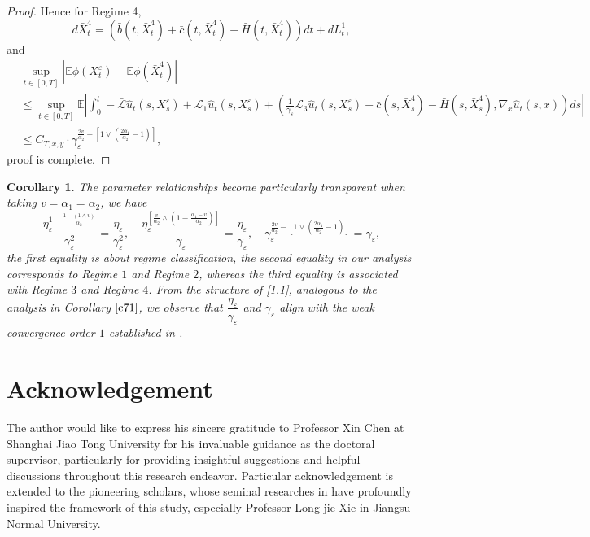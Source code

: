\documentclass[11pt,reqno]{amsart}
\newtheorem{corollary}{\indent Corollary}[section]
\numberwithin{equation}{section}
\begin{document}
\begin{proof}
Hence  for Regime 4,
\begin{equation}\label{7.25}
	d\bar{X}^{4}_{t}=(\bar{b}(t,\bar{X}^{4}_{t})+\bar{c}(t,\bar{X}^{4}_{t})+\bar{H}(t,\bar{X}^{4}_{t}))dt+dL_{t}^{1},
\end{equation}
and 
\begin{align*}
		&\sup_{t\in [0,T]}|\mathbb{E}\phi(X_{t}^{\varepsilon})-\mathbb{E}\phi(\bar{X}^{4}_{t})|\\
		&\leq\sup_{t\in [0,T]}\mathbb{E} \left|\int_{0}^{t}-\mathcal{\bar{L}}\hat{u}_{t}(s,X_{s}^{\varepsilon})+\mathcal{L}_{1}\hat{u}_{t}(s,X_{s}^{\varepsilon}) +(\frac{1}{\gamma_{\varepsilon}} \mathcal{L}_{3}\hat{u}_{t}(s,X_{s}^{\varepsilon})-\bar{c}(s,\bar{X}^{4}_{s})-\bar{H}(s,\bar{X}^{4}_{s}),\nabla_{x}\hat{u}_{t}(s,x)) ds\right| \\
		&\leq C_{T,x,y}\cdot \gamma_{\varepsilon}^{\frac{2v}{\alpha_{2}}-\left[ 1\vee \left( \frac{2\alpha_{1}}{\alpha_{2}}-1\right)   \right] },
\end{align*}
proof is complete.
\end{proof}

\begin{corollary}\label{c72}
The parameter relationships become particularly transparent when taking $v=\alpha_{1}=\alpha_{2}$, we have
$$ \frac{\eta_{\varepsilon}^{1-\frac{1-(1\wedge v)}{\alpha_{2}}}}{\gamma_{\varepsilon}^{2}}= \frac{\eta_{\varepsilon}}{\gamma_{\varepsilon}^{2}},\quad 	\frac{ \eta_{\varepsilon}^{\left[ \frac{v}{\alpha_{2}}\wedge \left( 1-\frac{\alpha_{1}-v}{\alpha_{2}} \right)\right]  }}{\gamma_{\varepsilon}}=\frac{\eta_{\varepsilon}}{\gamma_{\varepsilon}},\quad \gamma_{\varepsilon}^{\frac{2v}{\alpha_{2}}-\left[ 1\vee \left( \frac{2\alpha_{1}}{\alpha_{2}}-1\right)   \right] }=\gamma_{\varepsilon},$$
the first equality is about regime classification, the second equality in our analysis corresponds to Regime $1$ and Regime $2$, whereas the third equality is associated with Regime $3$ and Regime $4$. 
From the structure of \eqref{1.1}, analogous to the analysis in  Corollary $\ref{c71}$, we observe that $\dfrac{\eta_{\varepsilon}}{\gamma_{\varepsilon}}$ and $\gamma_{\varepsilon}$ align with the weak convergence order $1$ %
established in \cite{SXX}.
\end{corollary}


\section{Acknowledgement}
The author would like to express his sincere gratitude to Professor Xin Chen at Shanghai Jiao Tong University  for his invaluable guidance as the doctoral supervisor, particularly for providing insightful suggestions and helpful discussions throughout this research endeavor. Particular acknowledgement is extended to the pioneering scholars, whose seminal researches in \cite{LRSX,EY1,EY2,EY3,RX,SXX} have profoundly inspired the framework of this study, especially Professor Long-jie Xie in Jiangsu Normal University.
\end{document}
